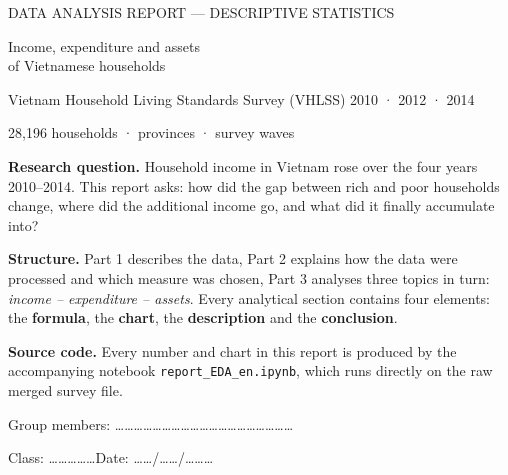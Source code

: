 \documentclass[11pt,a4paper]{article}
\begin{document}
\thispagestyle{empty}
\begin{center}
\vspace*{2cm}
{\footnotesize\color{blue}\MakeUppercase{Data analysis report — descriptive statistics}\par}
\vspace{10pt}
{\fontsize{25}{30}\selectfont\heavy\color{ink} Income, expenditure and assets\\of Vietnamese households\par}
\vspace{10pt}
{\large\color{ink2} Vietnam Household Living Standards Survey (VHLSS) 2010 · 2012 · 2014\par}
\vspace{20pt}
{\color{ink2} 28,196 households \quad· provinces \quad· survey waves\par}
\vspace{24pt}
\begin{tcolorbox}[colback=tintN, colframe=tintN, boxrule=0pt, arc=5pt, width=0.88\linewidth, left=14pt, right=14pt, top=10pt, bottom=10pt]
\small
\textbf{Research question.} Household income in Vietnam rose over the four years 2010–2014. This report asks: how did the gap between rich and poor households change, where did the additional income go, and what did it finally accumulate into?\par
\vspace{6pt}
\textbf{Structure.} Part 1 describes the data, Part 2 explains how the data were processed and which measure was chosen, Part 3 analyses three topics in turn: \emph{income – expenditure – assets}. Every analytical section contains four elements: the \textbf{formula}, the \textbf{chart}, the \textbf{description} and the \textbf{conclusion}.\par
\vspace{6pt}
\textbf{Source code.} Every number and chart in this report is produced by the accompanying notebook \texttt{report\_EDA\_en.ipynb}, which runs directly on the raw merged survey file.
\end{tcolorbox}
\vspace{20pt}
{\color{muted} Group members: …………………………………………………\par\vspace{4pt} Class: ……………\qquad Date: ……/……/………\par}
\end{center}
\newpage

{\small\tableofcontents}
\newpage

\end{document}
